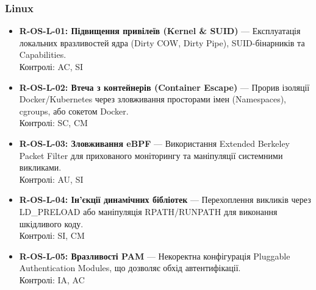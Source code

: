 \documentclass{article}
\begin{document}
\subsubsection{Linux}
\begin{itemize}
\item \textbf{R-OS-L-01: Підвищення привілеїв (Kernel \& SUID)} — Експлуатація локальних вразливостей ядра (Dirty COW, Dirty Pipe), SUID-бінарників та Capabilities.
\\ Контролі: AC, SI
\item \textbf{R-OS-L-02: Втеча з контейнерів (Container Escape)} — Прорив ізоляції Docker/Kubernetes через зловживання просторами імен (Namespaces), cgroups, або сокетом Docker.
\\ Контролі: SC, CM
\item \textbf{R-OS-L-03: Зловживання eBPF} — Використання Extended Berkeley Packet Filter для прихованого моніторингу та маніпуляції системними викликами.
\\ Контролі: AU, SI
\item \textbf{R-OS-L-04: Ін'єкції динамічних бібліотек} — Перехоплення викликів через LD\_PRELOAD або маніпуляція RPATH/RUNPATH для виконання шкідливого коду.
\\ Контролі: SI, CM
\item \textbf{R-OS-L-05: Вразливості PAM} — Некоректна конфігурація Pluggable Authentication Modules, що дозволяє обхід автентифікації.
\\ Контролі: IA, AC\end{itemize}
\end{document}
